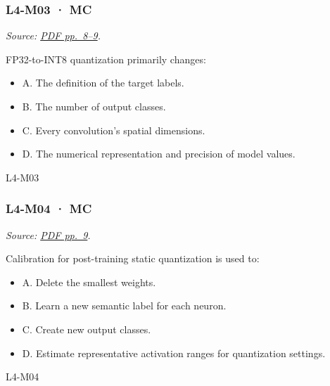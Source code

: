 \noindent\begin{minipage}{\linewidth}

\subsubsection{L4-M03 · MC}\label{l4-m03-mc}

\emph{Source:
\href{../Lab\%20Sessions/Lab4/manolo_presentation.pdf\#page=8}{PDF
pp.~8--9}.}

FP32-to-INT8 quantization primarily changes:

\begin{itemize}
\tightlist
\item
  A. The definition of the target labels.
\item
  B. The number of output classes.
\item
  C. Every convolution's spatial dimensions.
\item
  D. The numerical representation and precision of model values.
\end{itemize}

\begin{solution}[8mm]{L4-M03}

\end{solution}
\end{minipage}\par\medskip

\noindent\begin{minipage}{\linewidth}

\subsubsection{L4-M04 · MC}\label{l4-m04-mc}

\emph{Source:
\href{../Lab\%20Sessions/Lab4/manolo_presentation.pdf\#page=9}{PDF
pp.~9}.}

Calibration for post-training static quantization is used to:

\begin{itemize}
\tightlist
\item
  A. Delete the smallest weights.
\item
  B. Learn a new semantic label for each neuron.
\item
  C. Create new output classes.
\item
  D. Estimate representative activation ranges for quantization
  settings.
\end{itemize}

\begin{solution}[8mm]{L4-M04}

\end{solution}
\end{minipage}\par\medskip

